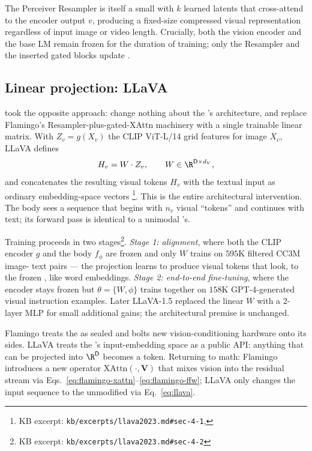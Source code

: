 The Perceiver Resampler is itself a small  with $k$ learned
 latents that cross-attend to the encoder output $v$, producing a
fixed-size compressed visual representation regardless of input image
or video length. Crucially, both the vision encoder and the base LM
remain frozen for the duration of training; only the Resampler and the
inserted gated  blocks update
\citep[\S 2.1]{alayrac2022-flamingo}.

\subsection{Linear projection: LLaVA}
\label{sec:multimodal-llava}

\citet{llava2023} took the opposite approach: change nothing about the
's architecture, and replace Flamingo's Resampler-plus-gated-XAttn
machinery with a single trainable linear matrix. With $Z_v = g(X_v)$
the CLIP ViT-L/14 grid features for image $X_v$, LLaVA defines
\begin{equation}
H_v = W \cdot Z_v, \qquad W \in \R^{\mathsf{D} \times d_V}, \label{eq:llava}
\end{equation}
and concatenates the resulting visual tokens $H_v$ with the textual
input as ordinary embedding-space vectors%
\footnote{KB excerpt: \nolinkurl{kb/excerpts/llava2023.md#sec-4-1}, }.
This is the entire architectural intervention. The  body sees a
sequence that begins with $n_v$ visual ``tokens'' and continues with
text; its forward pass is identical to a unimodal 's.

Training proceeds in two stages\footnote{KB excerpt:
\nolinkurl{kb/excerpts/llava2023.md#sec-4-2}}. \emph{Stage 1: 
alignment}, where both the CLIP encoder $g$ and the  body $f_\phi$
are frozen and only $W$ trains on $595\text{K}$ filtered CC3M image-
text pairs --- the projection learns to produce visual tokens that
look, to the frozen , like word embeddings. \emph{Stage 2:
end-to-end fine-tuning}, where the encoder stays frozen but
$\theta = \{W, \phi\}$ trains together on $158\text{K}$ GPT-4-generated
visual instruction examples. Later LLaVA-1.5 replaced the linear $W$
with a 2-layer MLP for small additional gains; the architectural
premise is unchanged.

\begin{analogy}
Flamingo treats the  as sealed and bolts new vision-conditioning
hardware onto its sides. LLaVA treats the 's input-embedding space
as a public API: anything that can be projected into $\R^{\mathsf{D}}$
becomes a token. Returning to math: Flamingo introduces a new operator
$\mathrm{XAttn}(\cdot, \mathbf{V})$ that mixes vision into the residual
stream via Eqs.~\eqref{eq:flamingo-xattn}--\eqref{eq:flamingo-ffw};
LLaVA only changes the input sequence to the unmodified  via
Eq.~\eqref{eq:llava}.
\end{analogy}

